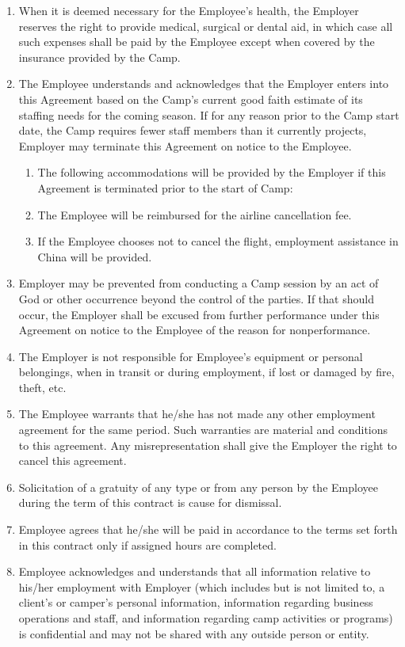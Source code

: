 \documentclass{rossasia}
\begin{document}
\begin{enumerate}
\item When it is deemed necessary for the Employee's health, the Employer reserves the right to provide medical, surgical or dental aid, in which case all such expenses shall be paid by the Employee except when covered by the insurance provided by the Camp. 
\item The Employee understands and acknowledges that the Employer enters into this Agreement based on the Camp's current good faith estimate of its staffing needs for the coming season.  If for any reason prior to the Camp start date, the Camp requires fewer staff members than it currently projects, Employer may terminate this Agreement on notice to the Employee. 
   \begin{enumerate}%
   \item The following accommodations will be provided by the Employer if this Agreement is terminated prior to the start of Camp: 
   \item The Employee will be reimbursed for the airline cancellation fee. 
   \item If the Employee chooses not to cancel the flight, employment assistance in China will be provided. 
   \end{enumerate}
\item Employer may be prevented from conducting a Camp session by an act of God or other occurrence beyond the control of the parties.  If that should occur, the Employer shall be excused from further performance under this Agreement on notice to the Employee of the reason for nonperformance. 
\item The Employer is not responsible for Employee's equipment or personal belongings, when in transit or during employment, if lost or damaged by fire, theft, etc.
\item The Employee warrants that he/she has not made any other employment agreement for the same period.  Such warranties are material and conditions to this agreement.  Any misrepresentation shall give the Employer the right to cancel this agreement. 
\item Solicitation of a gratuity of any type or from any person by the Employee during the term of this contract is cause for dismissal.
\item Employee agrees that he/she will be paid in accordance to the terms set forth in this contract only if assigned hours are completed.    
\item Employee acknowledges and understands that all information relative to his/her employment with Employer (which includes but is not limited to, a client's or camper's personal information, information regarding business operations and staff, and information regarding camp activities or programs) is confidential and may not be shared with any outside person or entity. 

\end{enumerate}
\end{document}
